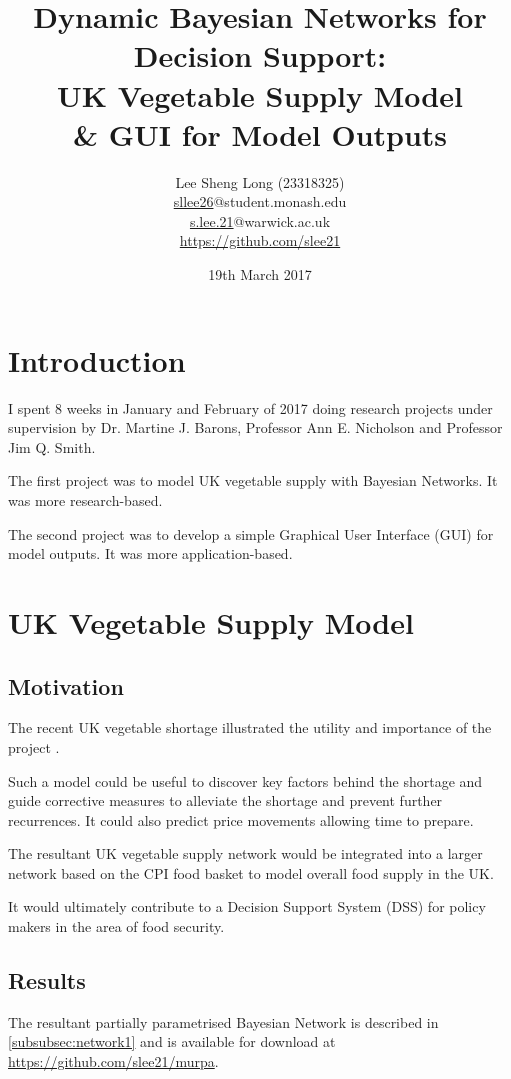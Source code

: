 \documentclass[12pt,notitlepage]{article}
\title{Dynamic Bayesian Networks for Decision Support: \\UK Vegetable Supply Model\\\& GUI for Model Outputs}
\author{Lee Sheng Long (23318325)\\
\href{mailto:sllee26@student.monash.edu}{sllee26}@student.monash.edu\\
\href{mailto:s.lee.21@warwick.ac.uk}{s.lee.21}@warwick.ac.uk\\
\url{https://github.com/slee21}
}
\begin{document}
\date{19th March 2017}
\maketitle

\begin{multicols}{2}
\tableofcontents
\end{multicols}

\clearpage
\restoregeometry
\setcounter{page}{1}
\pagestyle{fancy}
\begin{multicols}{2}
\section{Introduction}\label{sec:introduction}
I spent 8 weeks in January and February of 2017 doing research projects under supervision by Dr. Martine J. Barons, Professor Ann E. Nicholson and Professor Jim Q. Smith.

The first project was to model UK vegetable supply with Bayesian Networks. It was more research-based.

The second project was to develop a simple Graphical User Interface (GUI) for model outputs. It was more application-based.
\section{UK Vegetable Supply Model}\label{sec:statsmodel}
\subsection{Motivation}
The recent UK vegetable shortage illustrated the utility and importance of the project \parencite{bbc2017}. 

Such a model could be useful to discover key factors behind the shortage and guide corrective measures to alleviate the shortage and prevent further recurrences. It could also predict price movements allowing time to prepare.

The resultant UK vegetable supply network would be integrated into a larger network based on the CPI food basket to model overall food supply in the UK.

It would ultimately contribute to a Decision Support System (DSS) for policy makers in the area of food security.
\subsection{Results}
The resultant partially parametrised Bayesian Network is described in \ref{subsubsec:network1} and is available for download at \url{https://github.com/slee21/murpa}.

\end{multicols}
\end{document}
